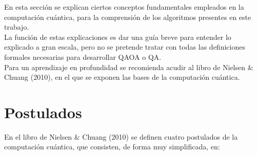 En esta sección se explican ciertos conceptos fundamentales empleados en la computación cuántica, para la comprensión de los algoritmos presentes en este trabajo.
\\
La función de estas explicaciones es dar una guía breve para entender lo explicado a gran escala, pero no se pretende tratar con todas las definiciones formales necesarias para desarrollar QAOA o QA\@.
\\
Para un aprendizaje en profundidad se recomienda acudir al libro de Nielsen \& Chuang (2010)\cite{Nielsen_Chuang_2010}, en el que se exponen las bases de la computación cuántica.

\section{Postulados\label{sec:8-concepto-postulados}}

En el libro de Nielsen \& Chuang (2010)\cite{Nielsen_Chuang_2010} se definen cuatro postulados de la computación cuántica, que consisten, de forma muy simplificada, en:

